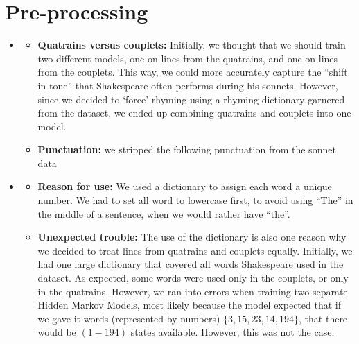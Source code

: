 \section{Pre-processing}
\medskip
\begin{itemize}

    \item {}
    \begin{itemize}
        \item \textbf{Quatrains versus couplets:} Initially, we thought that we should train two different models, one on lines from the quatrains, and one on lines from the couplets. This way, we could more accurately capture the ``shift in tone'' that Shakespeare often performs during his sonnets. However, since we decided to `force' rhyming using a rhyming dictionary garnered from the dataset, we ended up combining quatrains and couplets into one model.
        \item \textbf{Punctuation:} we stripped the following punctuation from the sonnet data
    \end{itemize}
    \item {}
    \begin{itemize}
        \item \textbf{Reason for use:} We used a dictionary to assign each word a unique number. We had to set all word to lowercase first, to avoid using ``The'' in the middle of a sentence, when we would rather have ``the''.
        \item \textbf{Unexpected trouble:} The use of the dictionary is also one reason why we decided to treat lines from quatrains and couplets equally. Initially, we had one large dictionary that covered all words Shakespeare used in the dataset. As expected, some words were used only in the couplets, or only in the quatrains. However, we ran into errors when training two separate Hidden Markov Models, most likely because the model expected that if we gave it words (represented by numbers) $\{ 3, 15, 23, 14, 194\}$, that there would be $(1-194)$ states available. However, this was not the case.
    \end{itemize}


\end{itemize}

